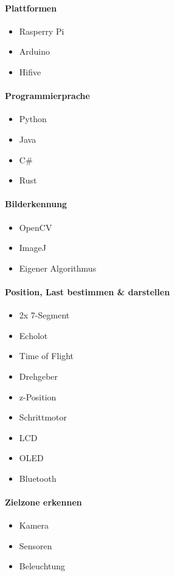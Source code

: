 \documentclass[a4paper]{report}
\begin{document}
\begin{multicols}{2}
\paragraph{Plattformen}
\begin{itemize}[noitemsep]
	\item Rasperry Pi
	\item Arduino
	\item Hifive
\end{itemize}

\paragraph{Programmierprache}
\begin{itemize}[noitemsep]
	\item Python
	\item Java
	\item C\#
	\item Rust
\end{itemize}

\paragraph{Bilderkennung}
\begin{itemize}[noitemsep]
	\item OpenCV
	\item ImageJ
	\item Eigener Algorithmus
\end{itemize}

\paragraph{Position, Last bestimmen \& darstellen}
\begin{itemize}[noitemsep]
	\item 2x 7-Segment
	\item Echolot
	\item Time of Flight
	\item Drehgeber
	\item z-Position
	\item Schrittmotor
	\item LCD
	\item OLED
	\item Bluetooth
\end{itemize}

\paragraph{Zielzone erkennen}
\begin{itemize}[noitemsep]
	\item Kamera
	\item Sensoren
	\item Beleuchtung
\end{itemize}


\end{multicols}
\end{document}
